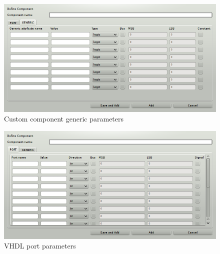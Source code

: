 \begin{figure}[h]
    \centering
    \includegraphics[width=.7\textwidth]{img/VHDL_create_generic.png}
    \caption{Custom component generic parameters}
\end{figure}

\begin{figure}[h]
    \centering
    \includegraphics[width=.7\textwidth]{img/VHDL_create_component.png}
    \caption{VHDL port parameters}
\end{figure}

